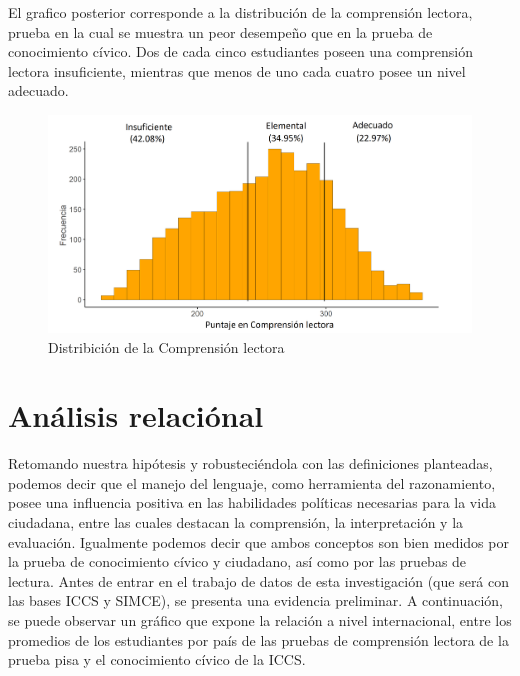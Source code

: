 \documentclass[12pt,twoside]{templates/facsothesis}
\begin{document}
El grafico posterior corresponde a la distribución de la comprensión lectora, prueba en la cual se muestra un peor desempeño que en la prueba de conocimiento cívico. Dos de cada cinco estudiantes poseen una comprensión lectora insuficiente, mientras que menos de uno cada cuatro posee un nivel adecuado.

\begin{figure}

{\centering \includegraphics[width=0.9\linewidth]{images/dist2} 

}

\caption{Distribición de la Comprensión lectora}\label{fig:unnamed-chunk-7}
\end{figure}

\hypertarget{anuxe1lisis-relaciuxf3nal}{%
\section{Análisis relaciónal}\label{anuxe1lisis-relaciuxf3nal}}

Retomando nuestra hipótesis y robusteciéndola con las definiciones planteadas, podemos decir que el manejo del lenguaje, como herramienta del razonamiento, posee una influencia positiva en las habilidades políticas necesarias para la vida ciudadana, entre las cuales destacan la comprensión, la interpretación y la evaluación. Igualmente podemos decir que ambos conceptos son bien medidos por la prueba de conocimiento cívico y ciudadano, así como por las pruebas de lectura. Antes de entrar en el trabajo de datos de esta investigación (que será con las bases ICCS y SIMCE), se presenta una evidencia preliminar. A continuación, se puede observar un gráfico que expone la relación a nivel internacional, entre los promedios de los estudiantes por país de las pruebas de comprensión lectora de la prueba pisa y el conocimiento cívico de la ICCS.
\end{document}
